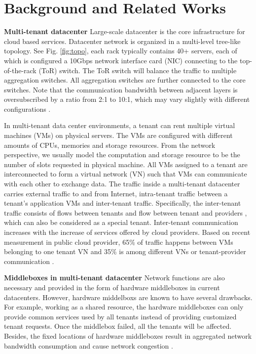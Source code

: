 \documentclass[review]{elsarticle}
\begin{document}
\section{Background and Related Works}\label{sec:background}
\textbf{Multi-tenant datacenter }
Large-scale datacenter is the core infrastructure for cloud based services. Datacenter network is organized in a multi-level tree-like topology. See Fig. \ref{fig:topo}, each rack typically contains 40+ servers, each of which is configured a 10Gbps network interface card (NIC) connecting to the top-of-the-rack (ToR) switch. The ToR switch will balance the traffic to multiple aggregation switches. All aggregation switches are further connected to the core switches. Note that the communication bandwidth between adjacent layers is oversubscribed by a ratio from 2:1 to 10:1, which may vary slightly with different configurations \cite{B13cta, williamson2010has}.

In multi-tenant data center environments, a tenant can rent multiple virtual machines (VMs) on physical servers. The VMs are configured with different amounts of CPUs, memories and storage resources. From the network perspective, we usually model the computation and storage resource to be the number of slots requested in physical machine. All VMs assigned to a tenant are interconnected to form a virtual network (VN) such that VMs can communicate with each other to exchange data. The traffic inside a multi-tenant datacenter carries external traffic to and from Internet, intra-tenant traffic between a tenant's application VMs and inter-tenant traffic. Specifically, the inter-tenant traffic consists of flows between tenants and flow between tenant and providers \cite{B13cta}, which can also be considered as a special tenant. Inter-tenant communication increases with the increase of services offered by cloud providers. Based on recent measurement in public cloud provider, 65\% of traffic happens between VMs belonging to one tenant VN and 35\% is among different VNs or tenant-provider communication \cite{B13cta, P13acs}.

\textbf{Middleboxes in multi-tenant datacenter }
Network functions are also necessary and provided in the form of hardware middleboxes in current datacenters.  However, hardware middelboxs are known to have several drawbacks. For example, working as a shared resource, the hardware middleboxes can only provide common services used by all tenants instead of providing customized tenant requests. Once the middlebox failed, all the tenants will be affected. Besides, the fixed locations of hardware middleboxes result in aggregated network bandwidth consumption and cause network congestion \cite{ClickOS, Y15NFV}. 
\end{document}
